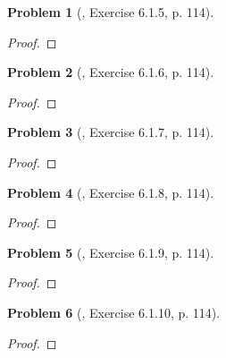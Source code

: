 \documentclass{article}
\newtheorem{problem}{Problem}
\begin{document}
\begin{problem}[\cite{Tao_analysis_1}, Exercise 6.1.5, p. 114]
	
\end{problem}

\begin{proof}[Proof]
	
\end{proof}

\begin{problem}[\cite{Tao_analysis_1}, Exercise 6.1.6, p. 114]
	
\end{problem}

\begin{proof}[Proof]
	
\end{proof}

\begin{problem}[\cite{Tao_analysis_1}, Exercise 6.1.7, p. 114]
	
\end{problem}

\begin{proof}[Proof]
	
\end{proof}

\begin{problem}[\cite{Tao_analysis_1}, Exercise 6.1.8, p. 114]
	
\end{problem}

\begin{proof}[Proof]
	
\end{proof}

\begin{problem}[\cite{Tao_analysis_1}, Exercise 6.1.9, p. 114]
	
\end{problem}

\begin{proof}[Proof]
	
\end{proof}

\begin{problem}[\cite{Tao_analysis_1}, Exercise 6.1.10, p. 114]
	
\end{problem}

\begin{proof}[Proof]
	
\end{proof}
\end{document}

